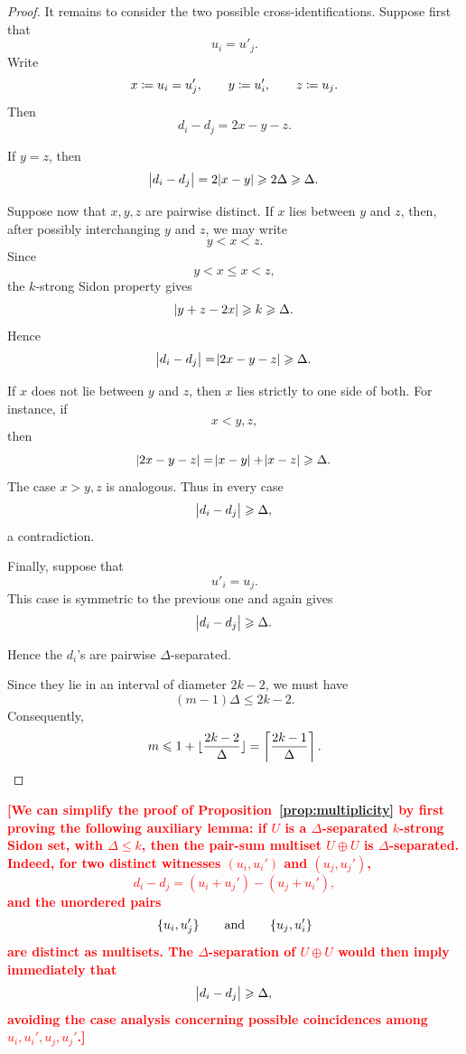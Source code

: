 \documentclass[reqno,a4paper,12pt]{amsart}
\newcommand{\afonso}[1]{\textcolor{red}{\textbf{[#1]}}}
\begin{document}
\begin{proof}
    It remains to consider the two possible cross-identifications.
    Suppose first that
    \[
        u_i=u'_j.
    \]
    Write
    \[
        x\mathrel{\coloneqq} u_i=u'_j,
        \qquad
        y\mathrel{\coloneqq} u'_i,
        \qquad
        z\mathrel{\coloneqq} u_j.
    \]
    Then
    \[
        d_i-d_j
        =
        2x-y-z.
    \]

    If \(y=z\), then
    \[
        \abs{d_i-d_j}
        =
        2\abs{x-y}
        \geqslant
        2\Delta
        \geqslant
        \Delta.
    \]

    Suppose now that \(x,y,z\) are pairwise distinct. If \(x\) lies
    between \(y\) and \(z\), then, after possibly interchanging \(y\)
    and \(z\), we may write
    \[
        y<x<z.
    \]
    Since
    \[
        y<x\leq x<z,
    \]
    the \(k\)-strong Sidon property gives
    \[
        \abs{y+z-2x}
        \geqslant k
        \geqslant\Delta.
    \]
    Hence
    \[
        \abs{d_i-d_j}
        =
        \abs{2x-y-z}
        \geqslant\Delta.
    \]

    If \(x\) does not lie between \(y\) and \(z\), then \(x\) lies
    strictly to one side of both. For instance, if
    \[
        x<y,z,
    \]
    then
    \[
        \abs{2x-y-z}
        =
        \abs{x-y}+\abs{x-z}
        \geqslant
        \Delta.
    \]
    The case \(x>y,z\) is analogous. Thus in every case
    \[
        \abs{d_i-d_j}\geqslant\Delta,
    \]
    a contradiction.

    Finally, suppose that
    \[
        u'_i=u_j.
    \]
    This case is symmetric to the previous one and again gives
    \[
        \abs{d_i-d_j}\geqslant\Delta.
    \]

    Hence the \(d_i\)'s are pairwise \(\Delta\)-separated.

    Since they lie in an interval of diameter \(2k-2\), we must have
    \[
        (m-1)\Delta\leq2k-2.
    \]
    Consequently,
    \[
        m
        \leqslant
        1+\lfloor\frac{2k-2}{\Delta}\rfloor
        =
        \left\lceil\frac{2k-1}{\Delta}\right\rceil.
    \]
\end{proof}

\afonso{We can simplify the proof of Proposition~\ref{prop:multiplicity}
    by first proving the following auxiliary lemma: if \(U\) is a
    \(\Delta\)-separated \(k\)-strong Sidon set, with
    \(\Delta\leq k\), then the pair-sum multiset \(U\oplus U\) is
    \(\Delta\)-separated. Indeed, for two distinct witnesses
    \((u_i,u_i')\) and \((u_j,u_j')\),
    \[
        d_i-d_j
        =
        (u_i+u_j')-(u_j+u_i'),
    \]
    and the unordered pairs
    \[
        \lbrace u_i,u_j'\rbrace
        \qquad\text{and}\qquad
        \lbrace u_j,u_i'\rbrace
    \]
    are distinct as multisets. The \(\Delta\)-separation of
    \(U\oplus U\) would then imply immediately that
    \[
        \abs{d_i-d_j}\geqslant\Delta,
    \]
    avoiding the case analysis concerning possible coincidences among
    \(u_i,u_i',u_j,u_j'\).}
\end{document}
